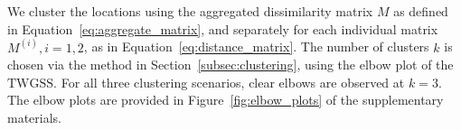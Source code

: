 \documentclass[12pt,compact]{article}
\newcommand{\JSGa}{\mathop{\mathrm{JS}^{\mathrm{G}_{\lambda}}}\nolimits}
\newcommand{\eJSGa}[1]{\mathop{\mathrm{eJS}_{i, #1}^{\mathrm{G}_{\lambda}}}\nolimits}
\begin{document}
We cluster the locations using the aggregated dissimilarity matrix $M$ as defined in Equation~\eqref{eq:aggregate_matrix}, and separately for each individual matrix $M^{(i)}, i = 1, 2$, as in Equation~\eqref{eq:distance_matrix}.
The number of clusters $k$ is chosen via the method in Section~\ref{subsec:clustering}, using the elbow plot of the $\mathrm{TWGSS}$. 
For all three clustering scenarios, clear elbows are observed at $k = 3$.
The elbow plots are provided in Figure~\ref{fig:elbow_plots} of the supplementary materials. 
\end{document}
